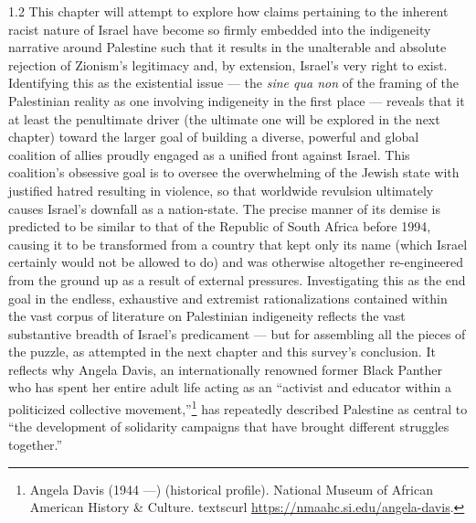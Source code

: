 \documentclass[../unravbook.tex]{subfiles}
\begin{document}
\begin{spacing}{1.2}
This chapter will attempt to explore how claims pertaining to the inherent racist nature of Israel have become so firmly embedded into the indigeneity narrative around Palestine such that it results in the unalterable and absolute rejection of Zionism's legitimacy and, by extension, Israel's very right to exist. Identifying this as the existential issue --- the \textit{sine qua non} of the framing of the  Palestinian reality as one involving indigeneity in the first place --- reveals that it at least the penultimate driver (the ultimate one will be explored in the next chapter) toward the larger goal of building a diverse, powerful and global coalition of allies proudly engaged as a unified front against Israel. This coalition's obsessive goal is to oversee the overwhelming of the Jewish state with justified hatred resulting in violence, so that worldwide revulsion ultimately causes Israel's downfall as a nation-state. The precise manner of its demise is predicted to be similar to that of the Republic of South Africa before 1994, causing it to be transformed from a country that kept only its name (which Israel certainly would not be allowed to do) and was otherwise altogether re-engineered from the ground up as a result of external pressures. Investigating this as the end goal in the endless, exhaustive and extremist rationalizations contained within the vast corpus of literature on Palestinian indigeneity reflects the vast substantive breadth of Israel's predicament --- but for assembling all the pieces of the puzzle, as attempted in the next chapter and this survey's conclusion. It reflects why Angela Davis, an internationally renowned former Black Panther who has spent her entire adult life acting as an ``activist and educator within a politicized collective movement,''\footnote{Angela Davis (1944 ---) (historical profile). National Museum of African American History \& Culture. textsc{url} \url{https://nmaahc.si.edu/angela-davis}.} has repeatedly described Palestine as central to ``the development of solidarity campaigns that have brought different struggles together.'' 


\end{spacing}
\end{document}
